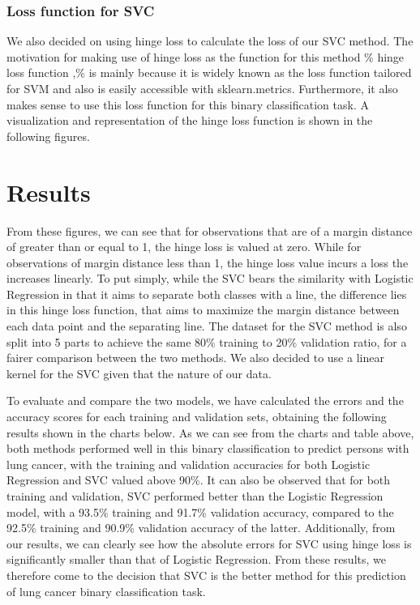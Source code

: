 \documentclass[a4paper,12pt]{article}
\begin{document}
\subsubsection{Loss function for SVC}
\label{sec:org80566e8}
We also decided on using hinge loss to calculate the loss of our SVC method. The motivation for making use of hinge loss as the function for this method \% hinge loss function  ,\% is mainly because it is widely known as the loss function tailored for SVM and also is easily accessible with sklearn.metrics. Furthermore, it also makes sense to use this loss function for this binary classification task. A visualization and representation of the hinge loss function is shown in the following figures.


\section{Results}
\label{sec:org32bc37f}
From these figures, we can see that for observations that are of a margin distance of greater than or equal to 1, the hinge loss is valued at zero. While for observations of margin distance less than 1, the hinge loss value incurs a loss the increases linearly. To put simply, while the SVC bears the similarity with Logistic Regression in that it aims to separate both classes with a line, the difference lies in this hinge loss function, that aims to maximize the margin distance between each data point and the separating line.
The dataset for the SVC method is also split into 5 parts to achieve the same 80\% training to 20\% validation ratio, for a fairer comparison between the two methods. We also decided to use a linear kernel for the SVC given that the nature of our data.

To evaluate and compare the two models, we have calculated the errors and the accuracy scores for each training and validation sets, obtaining the following results shown in the charts below.
As we can see from the charts and table above, both methods performed well in this binary classification to predict persons with lung cancer, with the training and validation accuracies for both Logistic Regression and SVC valued above 90\%. It can also be observed that for both training and validation, SVC performed better than the Logistic Regression model, with a 93.5\% training and 91.7\% validation accuracy, compared to the 92.5\% training and 90.9\% validation accuracy of the latter.
Additionally, from our results, we can clearly see how the absolute errors for SVC using hinge loss is significantly smaller than that of Logistic Regression.
From these results, we therefore come to the decision that SVC is the better method for this prediction of lung cancer binary classification task.
\end{document}

